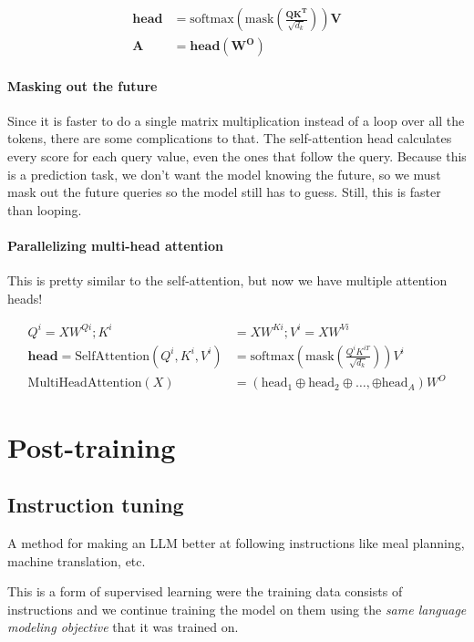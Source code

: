 \documentclass[11pt]{article}
\begin{document}
\begin{align*}
  \mathbf{head} & = \text{softmax}(\text{mask}(\frac{\mathbf{QK^T}}{\sqrt{d_k}})) \mathbf{V} \\
  \mathbf{A} & = \mathbf{head (W^O)}
\end{align*}

\paragraph{Masking out the future}

Since it is faster to do a single matrix multiplication instead of a loop over all the tokens, there are some complications to that. The self-attention head calculates every score for each query value, even the ones that follow the query. Because this is a prediction task, we don't want the model knowing the future, so we must mask out the future queries so the model still has to guess. Still, this is faster than looping.

\paragraph{Parallelizing multi-head attention}

This is pretty similar to the self-attention, but now we have multiple attention heads!

\begin{align*}
  Q^i = XW^{Qi}; K^i & = XW^{Ki}; V^i = XW^{Vi} \\
  \mathbf{head} = \text{SelfAttention}(Q^i, K^i, V^i) & = \text{softmax} ( \text{mask} (\frac{Q^iK^{iT}}{\sqrt{d_k}}) ) V^i \\
  \text{MultiHeadAttention}(X) & = (\text{head}_1 \oplus \text{head}_2 \oplus \dots, \oplus \text{head}_A) W^O
\end{align*}

\section{Post-training}

\subsection{Instruction tuning}

A method for making an LLM better at following instructions like meal planning, machine translation, etc.

This is a form of supervised learning were the training data consists of instructions and we continue training the model on them using the \textit{same language modeling objective} that it was trained on.
\end{document}
